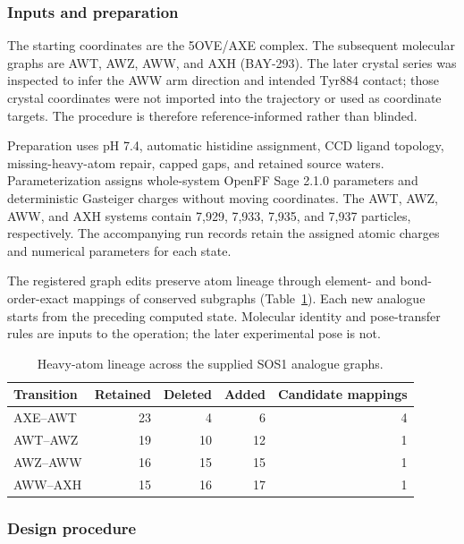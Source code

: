 \documentclass[11pt]{article}
\begin{document}
\begin{small}
\subsubsection{Inputs and preparation}

The starting coordinates are the 5OVE/AXE complex. The subsequent molecular graphs are AWT, AWZ, AWW, and AXH (BAY-293). The later crystal series was inspected to infer the AWW arm direction and intended Tyr884 contact; those crystal coordinates were not imported into the trajectory or used as coordinate targets. The procedure is therefore reference-informed rather than blinded.

Preparation uses pH 7.4, automatic histidine assignment, CCD ligand topology, missing-heavy-atom repair, capped gaps, and retained source waters. Parameterization assigns whole-system OpenFF Sage 2.1.0 parameters and deterministic Gasteiger charges without moving coordinates. The AWT, AWZ, AWW, and AXH systems contain 7,929, 7,933, 7,935, and 7,937 particles, respectively. The accompanying run records retain the assigned atomic charges and numerical parameters for each state.

The registered graph edits preserve atom lineage through element- and bond-order-exact mappings of conserved subgraphs (Table~\ref{tab:appA_lineage}). Each new analogue starts from the preceding computed state. Molecular identity and pose-transfer rules are inputs to the operation; the later experimental pose is not.

\begin{table}[htbp]
\centering\small
\caption{Heavy-atom lineage across the supplied SOS1 analogue graphs.}
\label{tab:appA_lineage}
\begin{tabular}{@{}lrrrr@{}}
\toprule
\textbf{Transition} & \textbf{Retained} & \textbf{Deleted} & \textbf{Added} & \textbf{Candidate mappings}\\
\midrule
AXE--AWT & 23 & 4 & 6 & 4\\
AWT--AWZ & 19 & 10 & 12 & 1\\
AWZ--AWW & 16 & 15 & 15 & 1\\
AWW--AXH & 15 & 16 & 17 & 1\\
\bottomrule
\end{tabular}
\end{table}

\subsubsection{Design procedure}


\end{small}
\end{document}
